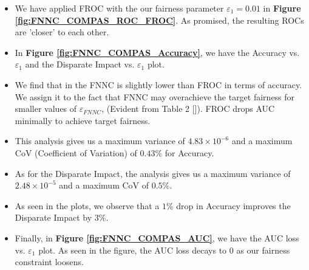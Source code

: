 \documentclass{article}
\newcommand{\ouralgo}{\texttt{FROC}}
\begin{document}
        
        

\begin{itemize}
    \item We have applied FROC with the our fairness parameter $\varepsilon_1 = 0.01$ in \textbf{Figure \ref{fig:FNNC_COMPAS_ROC_FROC}}. As promised, the resulting ROCs are 'closer' to each other.
    \item In \textbf{Figure \ref{fig:FNNC_COMPAS_Accuracy}}, we have the Accuracy vs. $\varepsilon_1$ and the Disparate Impact vs. $\varepsilon_1$ plot.
    \item We find that in the FNNC is slightly lower than FROC in terms of accuracy. We assign it to the fact that FNNC may overachieve the target fairness for smaller values of $\varepsilon_{FNNC}$, (Evident from Table 2 [\cite{padala21}]). FROC drops AUC minimally to achieve target fairness.
    \item This analysis gives us a maximum variance of $4.83\times10^{-6}$ and a maximum CoV (Coefficient of Variation) of $0.43\%$ for Accuracy.
    \item As for the Disparate Impact, the analysis gives us a maximum variance of $2.48\times10^{-5}$ and a maximum CoV of $0.5\%$.
    \item As seen in the plots, we observe that a $1\%$ drop in Accuracy improves the Disparate Impact by $3\%$.
    \item Finally, in \textbf{Figure \ref{fig:FNNC_COMPAS_AUC}}, we have the AUC loss vs. $\varepsilon_1$ plot. As seen in the figure, the AUC loss decays to $0$ as our fairness constraint loosens.
\end{itemize}


    
\end{document}
